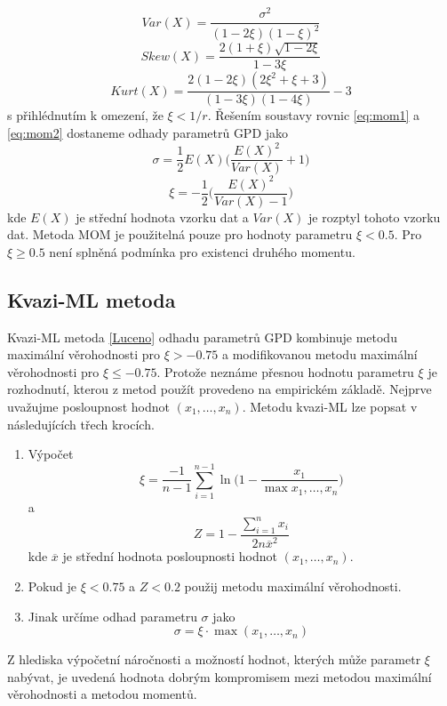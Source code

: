 \begin{equation}\label{eq:mom2}
Var(X)=\frac{\sigma^2}{(1-2\xi)(1-\xi)^2}
\end{equation}
\begin{equation}\label{eq:mom3}
Skew(X)=\frac{2(1+\xi)\sqrt{1-2\xi}}{1-3\xi}
\end{equation}
\begin{equation}
Kurt(X)=\frac{2(1-2\xi)(2\xi^2+\xi+3)}{(1-3\xi)(1-4\xi)}-3
\end{equation}
s přihlédnutím k omezení, že $\xi < 1/r$. Řešením soustavy rovnic \ref{eq:mom1} a \ref{eq:mom2} dostaneme odhady parametrů GPD jako
\begin{equation}
\sigma=\frac{1}{2}E(X)\Bigg(\frac{E(X)^2}{Var(X)}+1\Bigg)
\end{equation}
\begin{equation}
\xi=-\frac{1}{2}\Bigg(\frac{E(X)^2}{Var(X)-1}\Bigg)
\end{equation}
kde $E(X)$ je střední hodnota vzorku dat a $Var(X)$ je rozptyl tohoto vzorku dat. Metoda MOM je použitelná pouze pro hodnoty parametru $\xi < 0.5$. Pro $\xi \geq 0.5$ není splněná podmínka pro existenci druhého momentu. 

\subsection{Kvazi-ML metoda}
Kvazi-ML metoda \ref{Luceno} odhadu parametrů GPD kombinuje metodu maximální věrohodnosti pro $\xi > -0.75$ a modifikovanou metodu maximální věrohodnosti pro $\xi \leq -0.75$. Protože neznáme přesnou hodnotu parametru $\xi$ je rozhodnutí, kterou z metod použít provedeno na empirickém základě. Nejprve uvažujme posloupnost hodnot $(x_1,\dots, x_n)$. Metodu kvazi-ML lze popsat v následujících třech krocích.
\begin{enumerate}
\item Výpočet
\begin{equation}
\xi=\frac{-1}{n-1}\sum_{i=1}^{n-1} \ln \Big(1-\frac{x_1}{\max{x_1,\dots,x_n}}\Big)
\end{equation}
a
\begin{equation}
Z=1-\frac{\sum_{i=1}^n x_i}{2 n\overline{x}^2}
\end{equation}
kde $\overline{x}$ je střední hodnota posloupnosti hodnot $(x_1,\dots, x_n)$.
\item Pokud je $\xi<0.75$ a  $Z < 0.2$ použij metodu maximální věrohodnosti. 
\item Jinak určíme odhad parametru $\sigma$ jako
\begin{equation}
\sigma=\xi \cdot \max{(x_1,\dots,x_n)}
\end{equation}

\end{enumerate}
Z hlediska výpočetní náročnosti a možností hodnot, kterých může parametr $\xi$ nabývat, je uvedená hodnota dobrým kompromisem mezi metodou maximální věrohodnosti a metodou momentů.